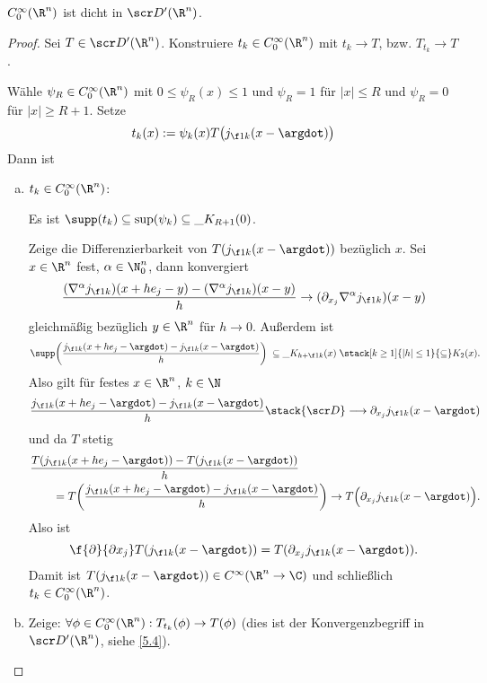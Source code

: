 \begin{st} \label{5.10}
	$C_0^\infty(\R^n)$ ist dicht in $\scr D'(\R^n)$.
	\begin{proof}
		Sei $T \in \scr D'(\R^n)$. Konstruiere $t_k \in C_0^\infty(\R^n)$ mit $t_k \to T$, bzw. $T_{t_k} \to T$.

		Wähle $\psi_R \in C_0^\infty(\R^n)$ mit $0 \le \psi_R(x) \le 1$ und $\psi_R = 1$ für $|x| \le R$ und $\psi_R = 0$ für $|x| \ge R + 1$.
		Setze
		\[
			t_k(x) := \psi_k (x) T\big(j_{\f 1k}(x - \argdot)\big)
		\]
		Dann ist
		\begin{enumerate}[a)]
			\item
				$t_k \in C_0^\infty(\R^n)$:

				Es ist $\supp(t_k) \subset \sup(\psi_k) \subset \_{K_{R+1}(0)}$.

				Zeige die Differenzierbarkeit von $T(j_{\f 1k}(x-\argdot))$ bezüglich $x$.
				Sei $x \in \R^n$ fest, $\alpha \in \N_0^n$, dann konvergiert
				\begin{align*}
					\dfrac {(\nabla^\alpha j_{\f 1k})(x+he_j - y) - (\nabla^\alpha j_{\f 1k})(x-y)}h
					\to (\partial_{x_j} \nabla^\alpha j_{\f 1k})(x-y)
				\end{align*}
				gleichmäßig bezüglich $y \in \R^n$ für $h\to 0$.
				Außerdem ist
				\[
					\supp \bigg( \dfrac{j_{\f 1k}(x+he_j - \argdot) - j_{\f 1k}(x-\argdot)}h \bigg)
					\;\subset \_{K_{h+ \f 1k}(x)} \;
					\stack[k \ge 1]{|h| \le 1}{\subset} K_2(x).
				\]
				Also gilt für festes $x \in \R^n$, $k \in \N$
				\[
					\dfrac {j_{\f 1k} (x+he_j - \argdot) - j_{\f 1k}(x-\argdot)}h
					\stack{\scr D}\longrightarrow \partial_{x_j} j_{\f 1k} (x-\argdot)
				\]
				und da $T$ stetig
				\begin{align*}
					&\dfrac {T(j_{\f 1k}(x+he_j-\argdot)) - T(j_{\f 1k}(x-\argdot))}h \\
					&\qquad = T \bigg( \dfrac {j_{\f 1k} (x+he_j - \argdot) - j_{\f 1k}(x-\argdot)}h \bigg)
					\to T \Big( \partial_{x_j} j_{\f 1k} (x-\argdot) \Big).
				\end{align*}
				Also ist
				\[
					\f{\partial}{\partial x_j} T (j_{\f 1k}(x-\argdot)) = T(\partial_{x_j} j_{\f 1k}(x-\argdot)).
				\]
				Damit ist $T(j_{\f 1k}(x-\argdot)) \in C^\infty(\R^n \to \C)$ und schließlich $t_k \in C_0^\infty(\R^n)$.
			\item
				Zeige: $\forall \phi \in C_0^\infty(\R^n) : T_{t_k}(\phi) \to T(\phi)$ (dies ist der Konvergenzbegriff in $\scr D'(\R^n)$, siehe \ref{5.4}).


\end{enumerate}
\end{proof}
\end{st}

